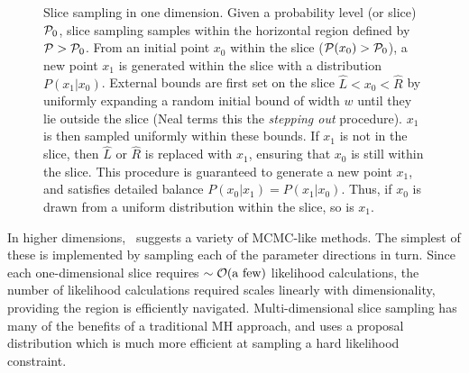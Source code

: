 \begin{figure}
  \caption{Slice sampling in one dimension. 
    Given a probability level (or slice) $\mathcal{P}_0$, slice sampling samples within the horizontal region defined by $\mathcal{P}>\mathcal{P}_0$. 
    From an initial point $x_0$ within the slice ($\mathcal{P}(x_0)>\mathcal{P}_0$), a new point $x_1$ is generated within the slice with a distribution $P(x_1|x_0)$.
    External bounds are first set on the slice $\hat{L}<x_0<\hat{R}$ by uniformly expanding a random initial bound of width $w$ until they lie outside the slice (Neal terms this the {\em stepping out\/} procedure). 
    $x_1$ is then sampled uniformly within these bounds.  
    If $x_1$ is not in the slice, then $\hat{L}$ or $\hat{R}$ is replaced with $x_1$, ensuring that $x_0$ is still within the slice.
    This procedure is guaranteed to generate a new point $x_1$, and satisfies detailed balance $P(x_0|x_1) = P(x_1|x_0)$. Thus, if $x_0$ is drawn from a uniform distribution within the slice, so is $x_1$.\label{fig:bay:1d_slice}
  }
\end{figure}



In higher dimensions,~\cite{NealSlice} suggests a variety of MCMC-like methods. The simplest of these is implemented by sampling each of the parameter directions in turn. Since each one-dimensional slice requires ${\sim\mathcal{O}{\left(\text{a few}\right)}}$ likelihood calculations, the number of likelihood calculations required scales linearly with dimensionality, providing the region is efficiently navigated. Multi-dimensional slice sampling has many of the benefits of a traditional MH approach, and uses a proposal distribution which is much more efficient at sampling a hard likelihood constraint.

